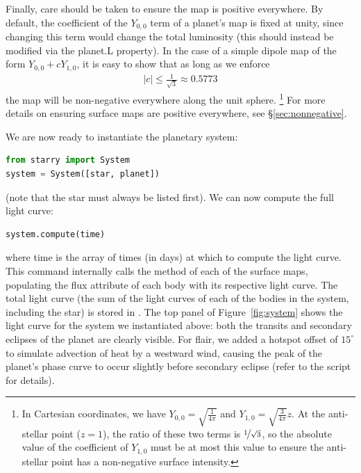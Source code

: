 \documentclass[modern]{aastex61}
\begin{document}
%
Finally, care should be taken to ensure the map is positive everywhere. By default,
the coefficient of the $Y_{0,0}$ term of a planet's map is fixed at unity, since
changing this term would change the total luminosity (this should instead be
modified via the \textsf{planet.L} property). In the case of a simple dipole map of
the form $Y_{0,0} + c Y_{1, 0}$, it is easy to show that as long as we enforce
%
\begin{align}
    |c| \le \frac{1}{\sqrt{3}} \approx 0.5773
\end{align}
%
the map will be non-negative everywhere along the unit sphere.
\footnote{In Cartesian coordinates, we have $Y_{0,0} = \sqrt{\frac{1}{4\pi}}$ and
$Y_{1,0} = \sqrt{\frac{3}{4\pi}}z$. At the anti-stellar point ($z = 1$), the ratio
of these two terms is $\nicefrac{1}{\sqrt{3}}$, so the absolute value of the
coefficient of $Y_{1,0}$ must be at most this value to ensure the anti-stellar
point has a non-negative surface intensity.}
%
For more details on ensuring surface maps are positive everywhere, see
\S\ref{sec:nonnegative}.

We are now ready to instantiate the planetary system:
%
\begin{lstlisting}[language=Python,firstnumber=last]
from starry import System
system = System([star, planet])
\end{lstlisting}
%
(note that the star must always be listed first).
We can now compute the full light curve:
%
\begin{lstlisting}[language=Python,firstnumber=last]
system.compute(time)
\end{lstlisting}
%
where \textsf{time} is the array of times (in days) at which to compute the
light curve. This command internally calls the \flux method of each
of the surface maps, populating the \textsf{flux} attribute of each body
with its respective light curve. The total light curve (the sum of the
light curves of each of the bodies in the system, including the star) is
stored in \starrySystemflux. The top panel of Figure~\ref{fig:system} shows
the light curve for the system we instantiated above: both the transits
and secondary eclipses of the planet are clearly visible. For flair, we added
a hotspot offset of $15^\circ$ to simulate advection of heat by a
westward wind, causing the peak of the planet's phase curve to occur slightly
before secondary eclipse (refer to the \Python script for details).
\end{document}
